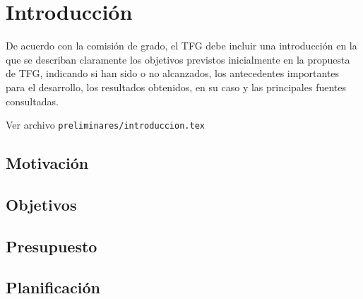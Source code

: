 %


\chapter{Introducción}

De acuerdo con la comisión de grado, el TFG debe incluir una introducción en la que se describan claramente los objetivos previstos inicialmente en la propuesta de TFG, indicando si han sido o no alcanzados, los antecedentes importantes para el desarrollo, los resultados obtenidos, en su caso y las principales fuentes consultadas.

Ver archivo \texttt{preliminares/introduccion.tex}

\section{Motivación}
\section{Objetivos}
\section{Presupuesto}
\section{Planificación}

\endinput
